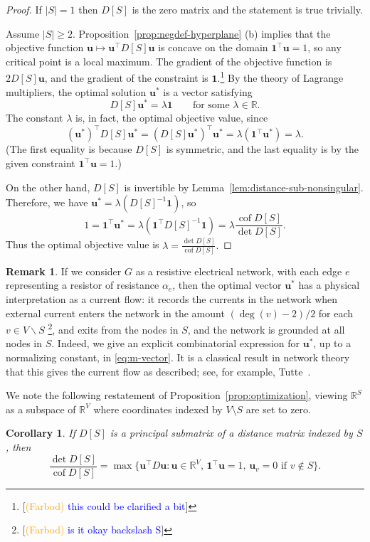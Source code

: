 \documentclass[12pt]{amsart}
\newtheorem{cor}[thm]{Corollary}
\theoremstyle{definition}
\newtheorem{rmk}[thm]{Remark}
\newcommand{\RR}{\mathbb{R}}
\newcommand{\bone}{\mathbf{1}}
\newcommand{\boldu}{\mathbf{u}}
\newcommand{\tr}{\intercal}
\DeclareMathOperator{\cof}{cof}
\newcommand\farbod[1]{\footnote{[\textcolor{orange}{(Farbod)} \textcolor{blue}{#1}]}}
\begin{document}
\begin{proof}
If $|S| = 1$ then $D[S]$ is the zero matrix and the statement is true trivially.

Assume $|S| \geq 2$.
Proposition~\ref{prop:negdef-hyperplane} (b) implies that 
the objective function $\boldu \mapsto \boldu^\tr D[S]\boldu$ is concave on the domain $\bone^\tr \boldu = 1$,
so any critical point is a local maximum.
The gradient of the objective function is $2 D[S] \boldu$, 
and the gradient of the constraint is $\bone$.\farbod{this could be clarified a bit}
By the theory of Lagrange multipliers, the optimal solution $\boldu^*$ is a vector satisfying
\[
	D[S] \boldu^* = \lambda \bone \qquad\text{for some }\lambda \in \RR.
\]
The constant $\lambda$ is, in fact, the optimal objective value, since
\[
	(\boldu^*)^\tr D[S] \boldu^* = (D[S] \boldu^*)^\tr \boldu^* = \lambda (\bone^\tr \boldu^*) = \lambda.
\]
(The first equality is because $D[S]$ is symmetric, and the last equality is by the given constraint $\bone^\tr \boldu = 1$.)

On the other hand,
 $D[S]$ is invertible by Lemma~\ref{lem:distance-sub-nonsingular}. Therefore, we have $ \boldu^* = \lambda (D[S]^{-1} \bone) $, so
\[
	1 = \bone^\tr \boldu^* = \lambda (\bone^\tr D[S]^{-1} \bone)
	= \lambda \frac{\cof D[S]}{\det D[S]}.
\]
Thus the optimal objective value is
$\displaystyle
	\lambda = \frac{\det D[S]}{\cof D[S]} .
$
\end{proof}

\begin{rmk}
If we consider $G$ as a resistive electrical network, with each edge $e$ representing a resistor of resistance $\alpha_e$,
then the optimal vector $\boldu^*$
has a physical interpretation as a current flow: 
it records the currents in the network when external current enters the network in the amount $(\deg(v) - 2)/2$ for each $v \in V \backslash S$ \farbod{is it okay backslash S}, and exits from the nodes in $S$, and the network is grounded at all nodes in $S$.
Indeed, we give an explicit combinatorial expression for $\boldu^*$, up to a normalizing constant, in \eqref{eq:m-vector}. It is a classical result in network theory that this gives the current flow as described; see, for example, Tutte~\cite[Section VI.6]{tutte}.
\end{rmk}

We note the following restatement of Proposition~\ref{prop:optimization}, viewing $\RR^S$ as a subspace of $\RR^V$ 
where coordinates indexed by $V \setminus S$ are set to zero.
\begin{cor}
\label{cor:optimization}
If $D[S]$ is a principal submatrix of a distance matrix indexed by $S$, then 
\[
	\frac{\det D[S]}{\cof D[S]} = \max \{\boldu^\tr D \boldu \colon \boldu \in \RR^V,\, \bone^\tr \boldu = 1,\, \boldu_v = 0 \text{ if } v \not\in S \}.
\]
\end{cor}
\end{document}
